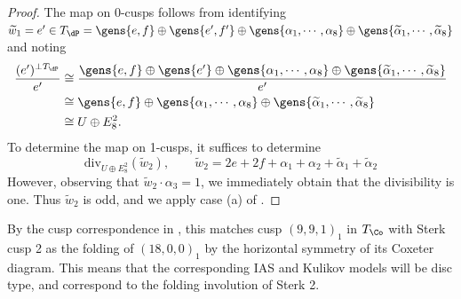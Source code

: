 \documentclass[../../main.tex]{subfiles}
\begin{document}
\begin{proof}
    The map on 0-cusps follows from identifying $\tilde w_1 = e' \in T_{\dP} = \gens{e,f} \oplus \gens{e', f'}\oplus \gens{\alpha_1,\cdots,\alpha_8}\oplus \gens{\tilde \alpha_1,\cdots, \tilde \alpha_8}$ and noting
    \begin{align*}
    { (e')^{\perp T_\dP} \over e'} &\cong
    {\gens{e,f} \oplus \gens{e'}\oplus \gens{\alpha_1,\cdots,\alpha_8}\oplus \gens{\tilde \alpha_1,\cdots, \tilde \alpha_8} \over e'} \\
    &\cong 
    \gens{e,f} \oplus \gens{\alpha_1,\cdots,\alpha_8}\oplus \gens{\tilde \alpha_1,\cdots, \tilde \alpha_8} 
    \\ &\cong U \oplus E_8^2.
    \end{align*}
    To determine the map on 1-cusps, it suffices to determine
    \[
    \mathrm{div}_{U\oplus E_8^2}(\tilde w_2), \qquad \tilde w_2 = 2e + 2f + \alpha_1 + \alpha_2 + \tilde \alpha_1 + \tilde \alpha_2
    \]
    However, observing that $\tilde w_2\cdot \alpha_3 = 1$, we immediately obtain that the divisibility is one. Thus $\tilde w_2$ is odd, and we apply case (a) of \cite[Thm. 5.10]{AE22}.
\end{proof}

\begin{remark}
    By the cusp correspondence in \cite{AEGS23}, this matches cusp $(9,9,1)_1$ in $T_\Co$ with Sterk cusp 2 as the folding of $(18,0,0)_1$ by the horizontal symmetry of its Coxeter diagram. This means that the corresponding IAS and Kulikov models will be disc type, and correspond to the folding involution of Sterk 2.
\end{remark}
\end{document}
